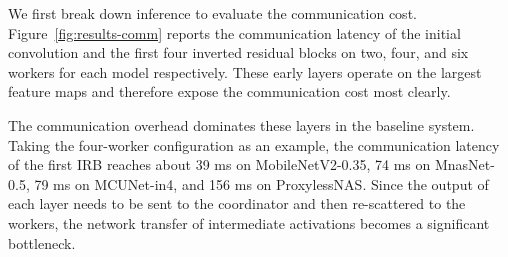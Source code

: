 
We first break down inference to evaluate the communication cost. Figure~\ref{fig:results-comm} reports the communication latency of the initial convolution and the first four inverted residual blocks on two, four, and six workers for each model respectively. These early layers operate on the largest feature maps and therefore expose the communication cost most clearly.

The communication overhead dominates these layers in the baseline system. Taking the four-worker configuration as an example, the communication latency of the first IRB reaches about 39 ms on MobileNetV2-0.35, 74 ms on MnasNet-0.5, 79 ms on MCUNet-in4, and 156 ms on ProxylessNAS. Since the output of each layer needs to be sent to the coordinator and then re-scattered to the workers, the network transfer of intermediate activations becomes a significant bottleneck. 

